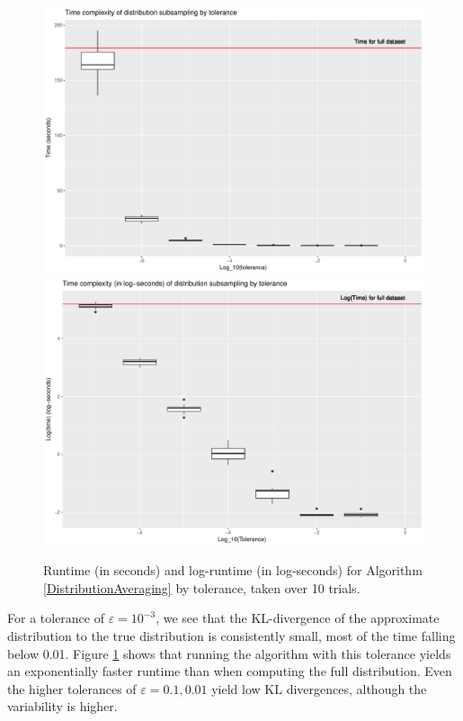 \documentclass{article}
\begin{document}
\begin{figure}
    \includegraphics[width=0.9\linewidth]{Figures/time_by_tol.pdf}
    \includegraphics[width=0.9\linewidth]{Figures/log_time_by_tol.pdf}
    \caption{Runtime (in seconds) and log-runtime (in log-seconds) for Algorithm \ref{DistributionAveraging} by tolerance, taken over 10 trials.}
    \label{fig:Times}
\end{figure}


For a tolerance of $\varepsilon = 10^{-3}$, we see that the KL-divergence of the approximate distribution to the true distribution is consistently small, most of the time falling below 0.01. 
Figure \ref{fig:Times} shows that running the algorithm with this tolerance yields an exponentially faster runtime than when computing the full distribution.  
Even the higher tolerances of $\varepsilon = 0.1, 0.01$ yield low KL divergences, although the variability is higher.
\end{document}
